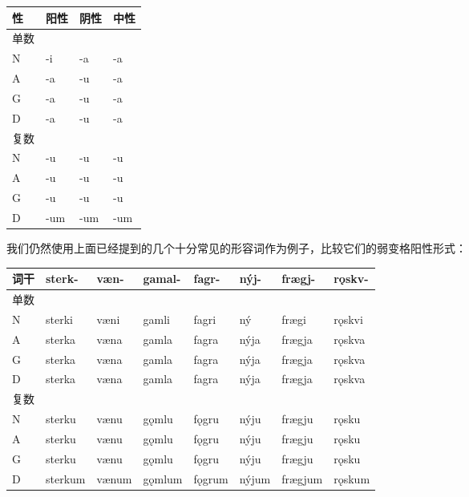 \begin{longtable}{llll}
    \toprule
    性   & 阳性 & 阴性 & 中性 \\
    \midrule
    \endhead
    \bottomrule
    \endfoot
    单数 &      &      &      \\
    N    & -i   & -a   & -a   \\
    A    & -a   & -u   & -a   \\
    G    & -a   & -u   & -a   \\
    D    & -a   & -u   & -a   \\
    复数 &      &      &      \\
    N    & -u   & -u   & -u   \\
    A    & -u   & -u   & -u   \\
    G    & -u   & -u   & -u   \\
    D    & -um  & -um  & -um  \\
\end{longtable}

我们仍然使用上面已经提到的几个十分常见的形容词作为例子，比较它们的弱变格阳性形式：

\begin{longtable}{llllllll}
    \toprule
    词干 & sterk-  & væn-  & gamal- & fagr-  & nýj-  & frægj-  & rǫskv- \\
    \midrule
    \endhead
    \bottomrule
    \endfoot
    单数 &         &       &        &        &       &         &        \\
    N    & sterki  & væni  & gamli  & fagri  & ný    & frægi   & rǫskvi \\
    A    & sterka  & væna  & gamla  & fagra  & nýja  & frægja  & rǫskva \\
    G    & sterka  & væna  & gamla  & fagra  & nýja  & frægja  & rǫskva \\
    D    & sterka  & væna  & gamla  & fagra  & nýja  & frægja  & rǫskva \\
    复数 &         &       &        &        &       &         &        \\
    N    & sterku  & vænu  & gǫmlu  & fǫgru  & nýju  & frægju  & rǫsku  \\
    A    & sterku  & vænu  & gǫmlu  & fǫgru  & nýju  & frægju  & rǫsku  \\
    G    & sterku  & vænu  & gǫmlu  & fǫgru  & nýju  & frægju  & rǫsku  \\
    D    & sterkum & vænum & gǫmlum & fǫgrum & nýjum & frægjum & rǫskum \\
\end{longtable}

